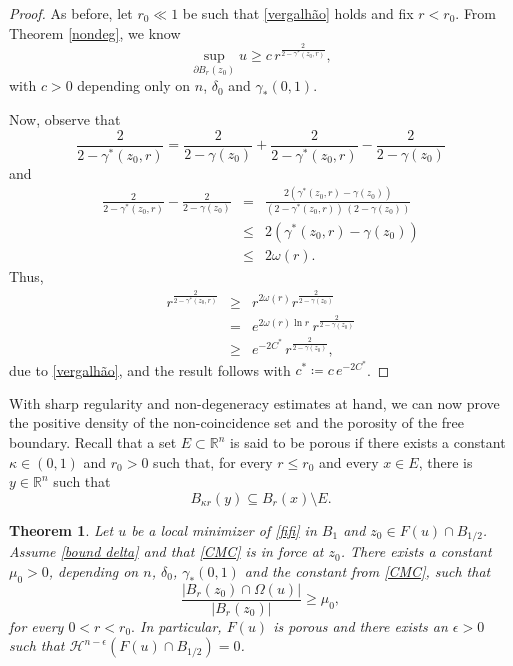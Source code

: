 \documentclass[reqno,11pt]{amsart}
\newtheorem{theorem}{Theorem}[section]
\newcommand{\1}{\mathds{1}}
\numberwithin{equation}{section}
\begin{document}
\begin{proof}
As before, let $r_0 \ll 1$ be such that \eqref{vergalhão} holds and fix $r<r_0$. From Theorem \ref{nondeg}, we know
$$\sup_{\partial B_r(z_0)} u \geq c \, r^{\frac{2}{2-\gamma^\ast(z_0,r)}},$$
with $c>0$ depending only on $n$, $\delta_0$ and $\gamma_\ast (0,1)$.

Now, observe that 
$$\frac{2}{2-\gamma^\ast(z_0,r)} = \frac{2}{2-\gamma(z_0)} + \frac{2}{2-\gamma^\ast(z_0,r)} - \frac{2}{2-\gamma(z_0)}$$
and
\begin{eqnarray*}
\displaystyle \frac{2}{2-\gamma^\ast(z_0,r)} - \frac{2}{2-\gamma(z_0)} & = &  \displaystyle \frac{2 ( \gamma^\ast(z_0,r) -\gamma(z_0) )}{( 2- \gamma^\ast(z_0,r)) \, ( 2-\gamma(z_0) )} \\
& \leq & \displaystyle  2 ( \gamma^\ast(z_0,r) -\gamma(z_0) )\\
& \leq & \displaystyle  2 \omega(r). 
\end{eqnarray*}
Thus,
\begin{eqnarray*}
\displaystyle r^{\frac{2}{2-\gamma^\ast(z_0,r)}} & \geq&   \displaystyle r^{2 \omega(r)} r^{\frac{2}{2-\gamma(z_0)}} \\
& = &  \displaystyle e^{2 \omega(r) \ln r} \, r^{\frac{2}{2-\gamma(z_0)}}\\
& \geq &  \displaystyle e^{-2 C^{\ast}} \, r^{\frac{2}{2-\gamma(z_0)}},
\end{eqnarray*}
due to \eqref{vergalhão}, and the result follows with $c^\ast \coloneqq  c \, e^{-2 C^{\ast}}$.
\end{proof}	

With sharp regularity and non-degeneracy estimates at hand, we can now prove the positive density of the non-coincidence set and the porosity of the free boundary. Recall that a set $E \subset \mathbb{R}^n$ is said to be porous if there exists a constant $\kappa \in (0,1)$ and $r_0>0$ such that, for every $r \leq r_0$ and every $x \in E$, there is $y \in \mathbb{R}^n$ such that
$$
    B_{\kappa r}(y) \subseteq B_r(x) \setminus E.
$$

\begin{theorem}\label{pos_density} Let $u$ be a local minimizer of \eqref{fifi} in $B_1$ and $z_0 \in F(u) \cap B_{1/2}$. Assume \eqref{bound delta} and that \eqref{CMC} is in force at $z_0$. There exists a constant $\mu_0 > 0$, depending on $n$, $\delta_0$, $\gamma_\ast (0,1)$ and the constant from \eqref{CMC}, such that
$$
	\frac{\left |B_r(z_0) \cap \Omega(u) \right |}{\left |B_r(z_0) \right |} \ge \mu_0,
$$
for every $0<r<r_0.$ In particular, $F(u)$ is porous and there exists an $\epsilon>0$ such that $\mathcal{H}^{n-\epsilon}(F(u) \cap B_{1/2}) = 0$.
\end{theorem}
\end{document}
